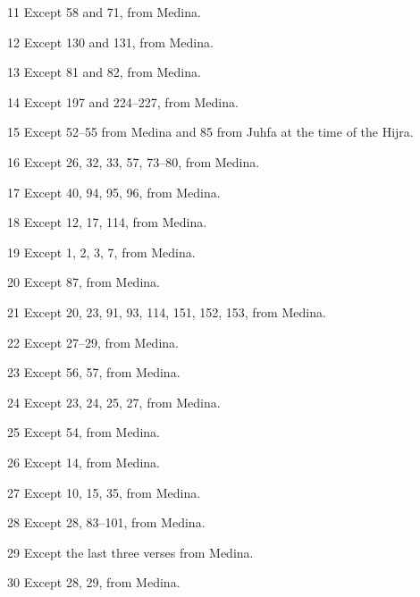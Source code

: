 \documentclass{article}
\begin{document}
\begin{center}
\begin{multicols}{3}
\begin{threeparttable}
\begin{tablenotes}
                \item[11] Except 58 and 71, from Medina.
                \item[12] Except 130 and 131, from Medina.
                \item[13] Except 81 and 82, from Medina.
                \item[14] Except 197 and 224--227, from Medina.
                \item[15] Except 52--55 from Medina and 85 from Juhfa at the time of the Hijra.
                \item[16] Except 26, 32, 33, 57, 73--80, from Medina.
                \item[17] Except 40, 94, 95, 96, from Medina.
                \item[18] Except 12, 17, 114, from Medina.
                \item[19] Except 1, 2, 3, 7, from Medina.
                \item[20] Except 87, from Medina.
                \item[21] Except 20, 23, 91, 93, 114, 151, 152, 153, from Medina.
                \item[22] Except 27--29, from Medina.
                \item[23] Except 56, 57, from Medina.
                \item[24] Except 23, 24, 25, 27, from Medina.
                \item[25] Except 54, from Medina.
                \item[26] Except 14, from Medina.
                \item[27] Except 10, 15, 35, from Medina.
                \item[28] Except 28, 83--101, from Medina.
                \item[29] Except the last three verses from Medina.
                \item[30] Except 28, 29, from Medina.
            \end{tablenotes}
        \end{threeparttable}

        \columnbreak


\end{multicols}
\end{center}
\end{document}
